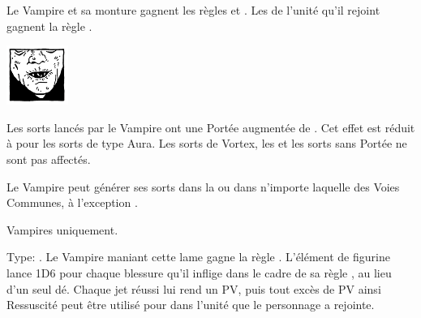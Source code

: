 \begin{multicols}{2}
 Le Vampire et sa monture gagnent les règles \poisonedattacks{} et . Les \ghouls{} de l'unité qu'il rejoint gagnent la règle \hatred{}.

\endpricelist

\begin{center}\includegraphics[width=2cm]{pics/logo_nosferatu.png}\end{center}
\vspace*{-1.5cm}

\vspace*{-0.2cm}
\startpricelist

 Les sorts lancés par le Vampire ont une Portée augmentée de . Cet effet est réduit à  pour les sorts de type Aura. Les sorts de Vortex, les \boundspells{} et les sorts sans Portée ne sont pas affectés.

 Le Vampire peut générer ses sorts dans la \Pathof{} \necromancy{} ou dans n'importe laquelle des Voies Communes, à l'exception \nature{}.

\endpricelist

\vspace*{\fill}
\end{multicols}

\closearmynewsection









\startarmymagicalitems

\armymagicalweapons

\startpricelist

 Vampires uniquement.

Type: \hw{}. Le Vampire maniant cette lame gagne la règle . L'élément de figurine lance 1D6 pour chaque blessure qu'il inflige dans le cadre de sa règle \vampiric{}, au lieu d'un seul dé. Chaque jet \vampiric{} réussi lui rend un PV, puis tout excès de PV ainsi Ressuscité peut être utilisé pour \raisewounds{} dans l'unité que le personnage a rejointe.

